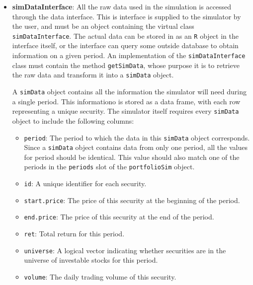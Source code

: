 \documentclass{article}
\begin{document}
\begin{itemize}

\item{\bf{simDataInterface}}: All the raw data used in the simulation
is accessed through the data interface.  This is interface is supplied
to the simulator by the user, and must be an object containing the
virtual class \texttt{simDataInterface}.  The actual data can be
stored in as an \texttt{R} object in the interface itself, or the
interface can query some outside database to obtain information on a
given period.  An implementation of the \texttt{simDataInterface}
class must contain the method \texttt{getSimData}, whose purpose it is
to retrieve the raw data and transform it into a \texttt{simData}
object.

A \texttt{simData} object contains all the information the simulator
will need during a single period.  This informationo is stored as a
data frame, with each row representing a unique security.  The simulator
itself requires every \texttt{simData} object to include the following
columns:

\begin{itemize}

\item{\texttt{period}}: The period to which the data in this
\texttt{simData} object corresponds.  Since a \texttt{simData} object
contains data from only one period, all the values for period should
be identical.  This value should also match one of the periods in the
\texttt{periods} slot of the \texttt{portfolioSim} object.

\item{\texttt{id}}: A unique identifier for each security.

\item{\texttt{start.price}}: The price of this security at the
beginning of the period.

\item{\texttt{end.price}}: The price of this security at the end of
the period.

\item{\texttt{ret}}: Total return for this period.

\item{\texttt{universe}}: A logical vector indicating whether
securities are in the universe of investable stocks for this period.

\item{\texttt{volume}}: The daily trading volume of this security.

\end{itemize}


\end{itemize}
\end{document}
